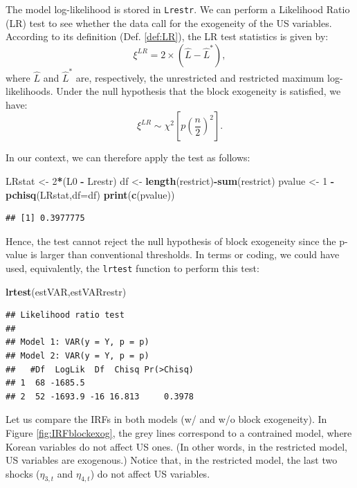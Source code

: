 \documentclass[
  11pt,
]{book}
\newenvironment{Shaded}{\begin{snugshade}}{\end{snugshade}}
\newcommand{\AttributeTok}[1]{\textcolor[rgb]{0.13,0.29,0.53}{#1}}
\newcommand{\DecValTok}[1]{\textcolor[rgb]{0.00,0.00,0.81}{#1}}
\newcommand{\FunctionTok}[1]{\textcolor[rgb]{0.13,0.29,0.53}{\textbf{#1}}}
\newcommand{\NormalTok}[1]{#1}
\newcommand{\OtherTok}[1]{\textcolor[rgb]{0.56,0.35,0.01}{#1}}
\newcommand{\SpecialCharTok}[1]{\textcolor[rgb]{0.81,0.36,0.00}{\textbf{#1}}}
\theoremstyle{definition}
\theoremstyle{definition}
\theoremstyle{definition}
\theoremstyle{definition}
\theoremstyle{remark}
\begin{document}
The model log-likelihood is stored in \texttt{Lrestr}. We can perform a Likelihood Ratio (LR) test to see whether the data call for the exogeneity of the US variables. According to its definition (Def. \ref{def:LR}), the LR test statistics is given by:
\[
\xi^{LR} =2 \times (\hat{L} - \hat{L}^*), 
\]
where \(\hat{L}\) and \(\hat{L}^*\) are, respectively, the unrestricted and restricted maximum log-likelihoods. Under the null hypothesis that the block exogeneity is satisfied, we have:
\[
\xi^{LR} \sim \chi^2\left[p\left(\frac{n}{2}\right)^2\right].
\]

In our context, we can therefore apply the test as follows:

\begin{Shaded}
\begin{Highlighting}[]
\NormalTok{LRstat }\OtherTok{\textless{}{-}} \DecValTok{2}\SpecialCharTok{*}\NormalTok{(L0 }\SpecialCharTok{{-}}\NormalTok{ Lrestr)}
\NormalTok{df }\OtherTok{\textless{}{-}} \FunctionTok{length}\NormalTok{(restrict)}\SpecialCharTok{{-}}\FunctionTok{sum}\NormalTok{(restrict)}
\NormalTok{pvalue }\OtherTok{\textless{}{-}} \DecValTok{1} \SpecialCharTok{{-}} \FunctionTok{pchisq}\NormalTok{(LRstat,}\AttributeTok{df=}\NormalTok{df)}
\FunctionTok{print}\NormalTok{(}\FunctionTok{c}\NormalTok{(pvalue))}
\end{Highlighting}
\end{Shaded}

\begin{verbatim}
## [1] 0.3977775
\end{verbatim}

Hence, the test cannot reject the null hypothesis of block exogeneity since the p-value is larger than conventional thresholds. In terms or coding, we could have used, equivalently, the \texttt{lrtest} function to perform this test:

\begin{Shaded}
\begin{Highlighting}[]
\FunctionTok{lrtest}\NormalTok{(estVAR,estVARrestr)}
\end{Highlighting}
\end{Shaded}

\begin{verbatim}
## Likelihood ratio test
## 
## Model 1: VAR(y = Y, p = p)
## Model 2: VAR(y = Y, p = p)
##   #Df  LogLik  Df  Chisq Pr(>Chisq)
## 1  68 -1685.5                      
## 2  52 -1693.9 -16 16.813     0.3978
\end{verbatim}

Let us compare the IRFs in both models (w/ and w/o block exogeneity). In Figure \ref{fig:IRFblockexog}, the grey lines correspond to a contrained model, where Korean variables do not affect US ones. (In other words, in the restricted model, US variables are exogenous.) Notice that, in the restricted model, the last two shocks (\(\eta_{3,t}\) and \(\eta_{4,t}\)) do not affect US variables.
\end{document}

